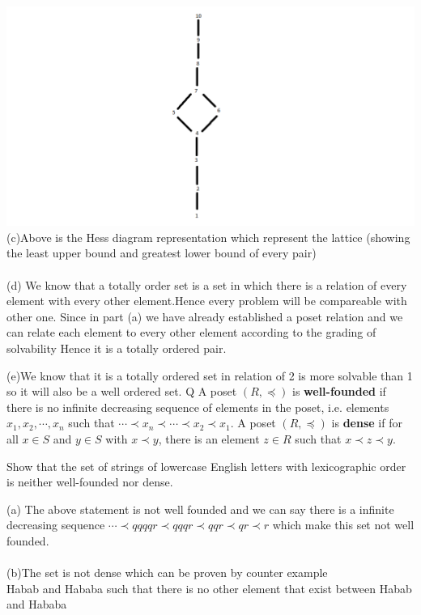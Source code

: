 \documentclass[addpoints]{exam}
\begin{document}
\begin{questions}
\begin{solution}
    \includegraphics[scale=0.5]{discrete.png}\\
    (c)Above is the Hess diagram representation which represent the lattice (showing the least upper bound and greatest lower bound of every pair)\\
    \\
    (d) We know that a totally order set is a set  in which there is a relation of every element with every other element.Hence every problem will be compareable with other one. Since in part (a) we have already established a poset relation and we can relate each element to every other element according to the grading of solvability Hence it is a totally ordered pair.
     \end{solution}
    (e)We know that it is a totally ordered set in relation of 2 is more solvable than 1 so it will also be a well ordered set. 
 Q  
\question 
A poset $(R, \preccurlyeq)$ is \textbf{well-founded} if there is no infinite decreasing sequence of elements in the poset, i.e. elements $x_1, x_2, \cdots, x_n$ such that $\cdots \prec x_n \prec \cdots  \prec x_2 \prec x_1$. A poset $(R, \preccurlyeq)$ is \textbf{dense} if for all $x \in S$ and $y \in S$ with $x \prec y$, there is an element $z \in R$ such that $x \prec z \prec y$.

Show that the set of strings of lowercase English letters with lexicographic order is neither well-founded nor dense.


  \begin{solution}
  (a) The above statement is not well founded and we can say there is a infinite decreasing sequence $\cdots \prec qqqqr  \prec qqqr \prec qqr  \prec qr \prec r$ which make this set not well founded.\\
 \\
 (b)The set is not dense which can be proven by counter example\\
 Habab and Hababa such that there is no other element that exist between Habab and Hababa\\
  \end{solution}


\end{questions}
\end{document}
